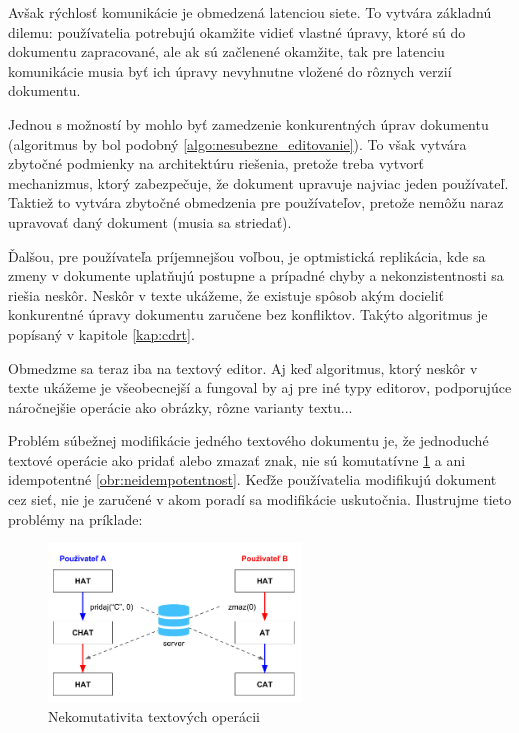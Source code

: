 Avšak rýchlosť komunikácie je obmedzená latenciou siete. To vytvára základnú dilemu: 
používatelia potrebujú okamžite vidieť vlastné úpravy, ktoré sú do dokumentu zapracované,
ale ak sú začlenené okamžite, tak pre latenciu komunikácie musia byť ich
úpravy nevyhnutne vložené do rôznych verzií dokumentu.

Jednou s možností by mohlo byť zamedzenie konkurentných úprav dokumentu (algoritmus by bol podobný
\ref{algo:nesubezne_editovanie}). To však vytvára zbytočné podmienky na architektúru riešenia,
pretože treba vytvorť mechanizmus, ktorý zabezpečuje, že dokument upravuje najviac jeden
používateľ. Taktiež to vytvára zbytočné obmedzenia pre používateľov, pretože nemôžu naraz
upravovať daný dokument (musia sa striedať).

Ďalšou, pre používateľa príjemnejšou voľbou, je optmistická
replikácia, kde sa zmeny v dokumente uplatňujú postupne a prípadné chyby a nekonzistentnosti sa
riešia neskôr. Neskôr v texte ukážeme, že existuje spôsob akým docieliť konkurentné úpravy 
dokumentu zaručene bez konfliktov. Takýto algoritmus je popísaný v kapitole \ref{kap:cdrt}.

Obmedzme sa teraz iba na textový editor. Aj keď algoritmus, ktorý neskôr v texte ukážeme je 
všeobecnejší a fungoval by aj pre iné typy editorov, podporujúce náročnejšie operácie ako
obrázky, rôzne varianty textu... 

\medskip

Problém súbežnej modifikácie jedného textového dokumentu je, že jednoduché textové operácie ako
pridať alebo zmazať znak, nie sú komutatívne \ref{obr:nekomutativita} a ani 
idempotentné \ref{obr:neidempotentnost}. Keďže používatelia
modifikujú dokument cez sieť, nie je zaručené v akom poradí sa modifikácie uskutočnia. 
Ilustrujme tieto problémy na príklade:

\begin{figure}[H]
\centerline{\includegraphics[width=0.6\textwidth]{images/nekomutativne_operacie}}
\caption[Nekomutativita textových operácii]{Nekomutativita textových operácii}
\label{obr:nekomutativita}
\end{figure}

